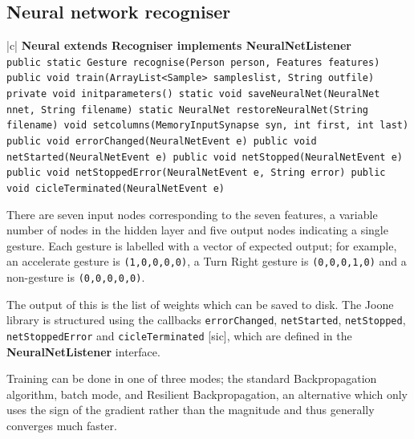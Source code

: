 \documentclass[12pt,a4,notitlepage]{report}
\renewcommand{\_}{\texttt{\symbol{95}}}
\newcommand{\<}{\texttt{\symbol{60}}}
\renewcommand{\>}{\texttt{\symbol{62}}}
\newcommand{\class}[1]{\textbf{#1}}
\newcommand{\variable}[1]{\texttt{#1}}
\begin{document}
\subsection{Neural network recogniser}

\begin{tabular}{|c|} \hline 
\class{Neural extends Recogniser implements NeuralNetListener} \\ \hline
{}
{ \variable{public static Gesture recognise(Person person, Features features) \newline
public void train(ArrayList<Sample> sampleslist, String out\_file) \newline
private void init\_parameters() \newline
static void saveNeuralNet(NeuralNet nnet, String filename) \newline
static NeuralNet restoreNeuralNet(String filename) \newline
void set\_columns(MemoryInputSynapse syn, int first, int last) \newline
public void errorChanged(NeuralNetEvent e) \newline
public void netStarted(NeuralNetEvent e) \newline
public void netStopped(NeuralNetEvent e) \newline
public void netStoppedError(NeuralNetEvent e, String error) \newline
public void cicleTerminated(NeuralNetEvent e)
} } \\ \hline
\end{tabular}

There are seven input nodes corresponding to the seven features, a variable number of nodes in the hidden layer and five output nodes indicating a single gesture. Each gesture is labelled with a vector of expected output; for example, an accelerate gesture is \variable{(1,0,0,0,0)}, a Turn Right gesture is \variable{(0,0,0,1,0)} and a non-gesture is \variable{(0,0,0,0,0)}.

The output of this is the list of weights which can be saved to disk. The Joone library is structured using the callbacks \variable{errorChanged}, \variable{netStarted}, \variable{netStopped}, \variable{netStoppedError} and \variable{cicleTerminated} [sic], which are defined in the \class{NeuralNetListener} interface.

Training can be done in one of three modes; the standard Backpropagation algorithm, batch mode, and Resilient Backpropagation, an alternative which only uses the sign of the gradient rather than the magnitude and thus generally converges much faster.
\end{document}
